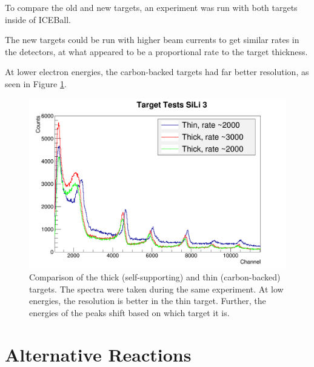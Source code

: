 To compare the old and new targets, an experiment was run with both targets inside of ICEBall. 

The new targets could be run with higher beam currents to get similar rates in the detectors, at what appeared to be a proportional rate to the target thickness.

At lower electron energies, the carbon-backed targets had far better resolution, as seen in Figure \ref{fig:target_test}.

\begin{figure}
    \centering
    \includegraphics[scale=0.4]{Future_Figs/SiLi3.png}
    \caption{Comparison of the thick (self-supporting) and thin (carbon-backed) targets. The spectra were taken during the same experiment. At low energies, the resolution is better in the thin target. Further, the energies of the peaks shift based on which target it is.}
    \label{fig:target_test}
\end{figure}

\section{Alternative Reactions}

%
% 
% 
